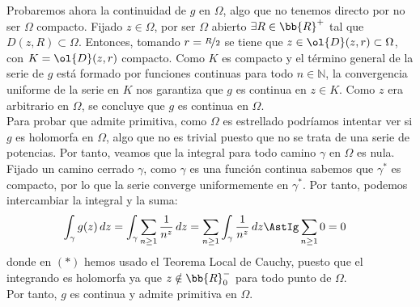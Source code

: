 \documentclass[12pt]{article}
\begin{document}
\begin{ejercicio}[3.5 puntos]
\begin{itemize}
            Probaremos ahora la continuidad de $g$ en $\Omega$, algo que no tenemos directo por no ser $\Omega$ compacto. Fijado $z\in \Omega$, por ser $\Omega$ abierto $\exists R\in \bb{R}^+$ tal que $D(z,R)\subset \Omega$. Entonces, tomando $r=\nicefrac{R}{2}$ se tiene que $z\in \ol{D}(z,r)\subset \Omega$, con $K=\ol{D}(z,r)$ compacto. Como $K$ es compacto y el término general de la serie de $g$ está formado por funciones continuas para todo $n\in \mathbb{N}$, la convergencia uniforme de la serie en $K$ nos garantiza que $g$ es continua en $z\in K$. Como $z$ era arbitrario en $\Omega$, se concluye que $g$ es continua en $\Omega$.\\

            Para probar que admite primitiva, como $\Omega$ es estrellado podríamos intentar ver si $g$ es holomorfa en $\Omega$, algo que no es trivial puesto que no se trata de una serie de potencias. Por tanto, veamos que la integral para todo camino $\gamma$ en $\Omega$ es nula. Fijado un camino cerrado $\gamma$, como $\gamma$ es una función continua sabemos que $\gamma^*$ es compacto, por lo que la serie converge uniformemente en $\gamma^*$. Por tanto, podemos intercambiar la integral y la suma:
            \begin{align*}
                \int_{\gamma} g(z) \, dz &= \int_{\gamma} \sum_{n\geq 1} \frac{1}{n^z} \, dz = \sum_{n\geq 1} \int_{\gamma} \frac{1}{n^z} \, dz
                \AstIg \sum_{n\geq 1} 0 = 0
            \end{align*}
            donde en $(\ast)$ hemos usado el Teorema Local de Cauchy, puesto que el integrando es holomorfa ya que $z\notin \bb{R}^-_0$ para todo punto de $\Omega$.\\

            Por tanto, $g$ es continua y admite primitiva en $\Omega$.
        \end{itemize}

    \end{ejercicio}
\end{document}
